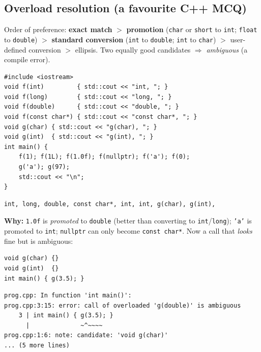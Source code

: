 \documentclass[10pt,a4paper,openany,oneside]{report}
\begin{document}
\subsection{Overload resolution (a favourite C++ MCQ)}
Order of preference: \textbf{exact match} $>$ \textbf{promotion} (\texttt{char} or \texttt{short} to \texttt{int}; \texttt{float} to \texttt{double}) $>$ \textbf{standard conversion} (\texttt{int} to \texttt{double}; \texttt{int} to \texttt{char}) $>$ user-defined conversion $>$ ellipsis. Two equally good candidates $\Rightarrow$ \emph{ambiguous} (a compile error).
\begin{lstlisting}[language={[11]C++},title={Which overload is called?}]
#include <iostream>
void f(int)         { std::cout << "int, "; }
void f(long)        { std::cout << "long, "; }
void f(double)      { std::cout << "double, "; }
void f(const char*) { std::cout << "const char*, "; }
void g(char) { std::cout << "g(char), "; }
void g(int)  { std::cout << "g(int), "; }
int main() {
    f(1); f(1L); f(1.0f); f(nullptr); f('a'); f(0);
    g('a'); g(97);
    std::cout << "\n";
}
\end{lstlisting}
\begin{lstlisting}[style=out,title={Answer: captured output}]
int, long, double, const char*, int, int, g(char), g(int), 
\end{lstlisting}
\textbf{Why:} \texttt{1.0f} is \emph{promoted} to \texttt{double} (better than converting to \texttt{int}/\texttt{long}); \texttt{'a'} is promoted to \texttt{int}; \texttt{nullptr} can only become \texttt{const char*}. Now a call that \emph{looks} fine but is ambiguous:
\begin{lstlisting}[language={[11]C++},title={g(3.5): double converts equally well to char and to int}]
void g(char) {}
void g(int)  {}
int main() { g(3.5); }
\end{lstlisting}
\begin{lstlisting}[style=out]
prog.cpp: In function 'int main()':
prog.cpp:3:15: error: call of overloaded 'g(double)' is ambiguous
    3 | int main() { g(3.5); }
      |              ~^~~~~
prog.cpp:1:6: note: candidate: 'void g(char)'
... (5 more lines)
\end{lstlisting}
\end{document}
